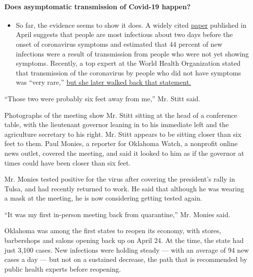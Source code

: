 \begin{itemize}
{  \paragraph{Does asymptomatic transmission of Covid-19
  happen?}\label{does-asymptomatic-transmission-of-covid-19-happen}}

  \begin{itemize}
  \tightlist
  \item
    So far, the evidence seems to show it does. A widely cited
    \href{https://www.nature.com/articles/s41591-020-0869-5}{paper}
    published in April suggests that people are most infectious about
    two days before the onset of coronavirus symptoms and estimated that
    44 percent of new infections were a result of transmission from
    people who were not yet showing symptoms. Recently, a top expert at
    the World Health Organization stated that transmission of the
    coronavirus by people who did not have symptoms was ``very rare,''
    \href{https://www.nytimes.com/2020/06/09/world/coronavirus-updates.html?action=click\&pgtype=Article\&state=default\&region=MAIN_CONTENT_3\&context=storylines_faq\#link-1f302e21}{but
    she later walked back that statement.}
  \end{itemize}
\end{itemize}

``Those two were probably six feet away from me,'' Mr. Stitt said.

Photographs of the meeting show Mr. Stitt sitting at the head of a
conference table, with the lieutenant governor leaning in to his
immediate left and the agriculture secretary to his right. Mr. Stitt
appears to be sitting closer than six feet to them. Paul Monies, a
reporter for Oklahoma Watch, a nonprofit online news outlet, covered the
meeting, and said it looked to him as if the governor at times could
have been closer than six feet.

Mr. Monies tested positive for the virus after covering the president's
rally in Tulsa, and had recently returned to work. He said that although
he was wearing a mask at the meeting, he is now considering getting
tested again.

``It was my first in-person meeting back from quarantine,'' Mr. Monies
said.

Oklahoma was among the first states to reopen its economy, with stores,
barbershops and salons opening back up on April 24. At the time, the
state had just 3,100 cases. New infections were holding steady --- with
an average of 94 new cases a day --- but not on a sustained decrease,
the path that is recommended by public health experts before reopening.

